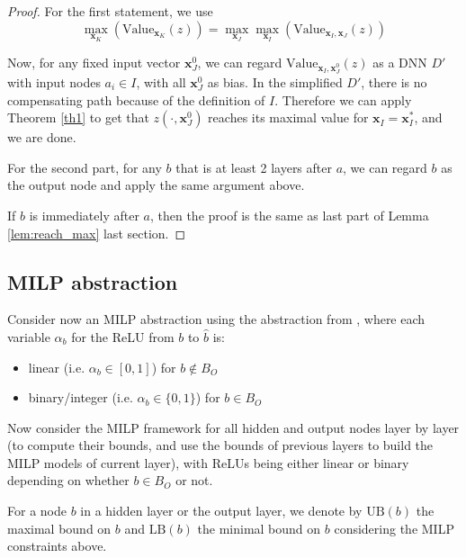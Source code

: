 \documentclass[]{article}
\theoremstyle{definition}
\newtheorem{definition}{Definition}
\newcommand{\Val}{\mathrm{Value}}
\newcommand{\UB}{\mathrm{UB}}
\newcommand{\LB}{\mathrm{LB}}
\newcommand{\B}{\mathrm{B}}
\begin{document}
\begin{proof}
	For the first statement, we use 
	$$\max_{\boldsymbol{x}_K} (\Val_{\boldsymbol{x}_K}(z)) =\max_{\boldsymbol{x}_J} \max_{\boldsymbol{x}_I} (\Val_{\boldsymbol{x}_I,\boldsymbol{x}_J}(z))$$
	
	Now, for any fixed input vector $\boldsymbol{x}^0_J$, we can regard $\Val_{\boldsymbol{x}_I,\boldsymbol{x}^0_J}(z)$ as a DNN $D'$ with input nodes $a_i\in I$, with all $\boldsymbol{x}^0_J$ %
	as bias. In the simplified $D'$, there is no compensating path because of the definition of $I$. Therefore we can apply Theorem \ref{th1} to get that $z(\cdot,\boldsymbol{x}^0_J)$ reaches its maximal value for $\boldsymbol{x}_I=\boldsymbol{x}_I^*$, and we are done.
	
	For the second part, for any $b$ that is at least 2 layers after $a$, we can regard $b$ as the output node and apply the same argument above.
	
	If $b$ is immediately after $a$, then the proof is the same as last part of Lemma \ref{lem:reach_max} last section.
	

\end{proof}


\subsection{MILP abstraction}

Consider now an MILP abstraction using the abstraction from \cite{MILP}, 
where each variable $\alpha_b$ for the ReLU from $b$ to $\hat{b}$ is:
\begin{itemize}
	\item linear  (i.e. $\alpha_b \in [0,1]$) for $b \notin B_{O}$
	\item binary/integer (i.e. $\alpha_b \in \{0,1\}$) for $b \in B_{O}$
\end{itemize}

Now consider the MILP framework for all hidden and output nodes layer by layer (to compute their bounds, and use the bounds of previous layers to build the MILP models of current layer), with ReLUs being either linear or binary depending on whether $b \in B_{O}$ or not.

For a node $b$ in a hidden layer or the output layer, we denote by $\UB(b)$ the maximal bound on $b$ and $\LB(b)$ the minimal bound on $b$ considering the MILP constraints above.


%
\end{document}
